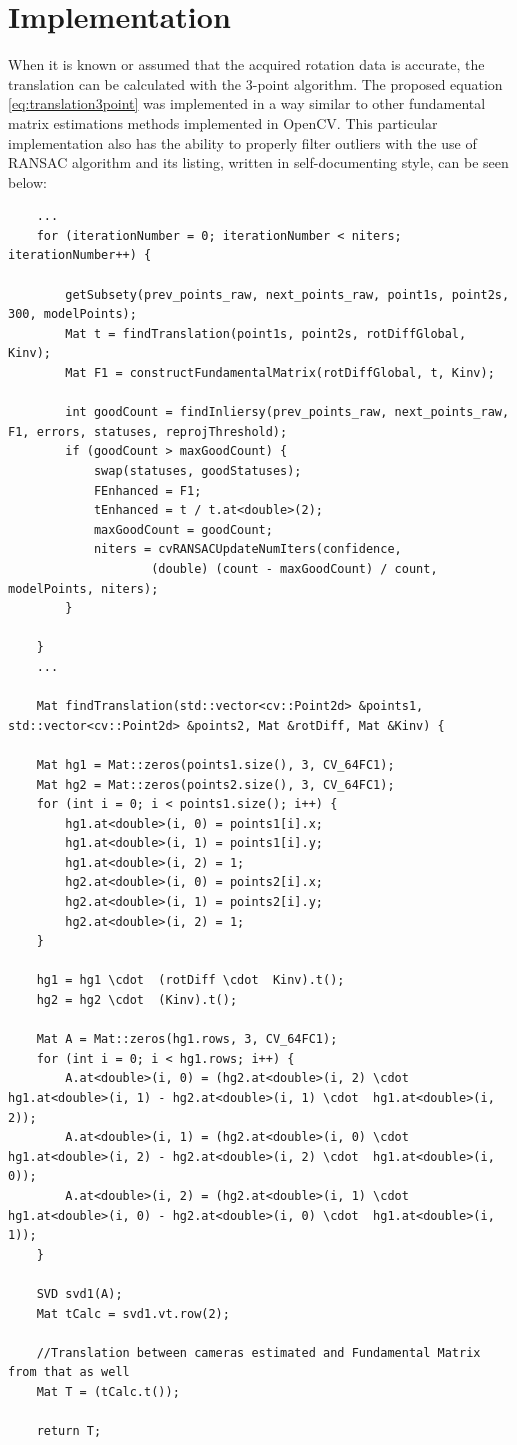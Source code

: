 \section{Implementation} %
When it is known or assumed that the acquired rotation data is accurate, the translation can be calculated with the 3-point algorithm. The proposed equation \ref{eq:translation3point} was implemented in a way similar to other fundamental matrix estimations methods implemented in OpenCV. This particular implementation also has the ability to properly filter outliers with the use of RANSAC algorithm and its listing, written in self-documenting style, can be seen below:
\begin{lstlisting}
    ...
    for (iterationNumber = 0; iterationNumber < niters; iterationNumber++) {

        getSubsety(prev_points_raw, next_points_raw, point1s, point2s, 300, modelPoints);
        Mat t = findTranslation(point1s, point2s, rotDiffGlobal, Kinv);
        Mat F1 = constructFundamentalMatrix(rotDiffGlobal, t, Kinv);

        int goodCount = findInliersy(prev_points_raw, next_points_raw, F1, errors, statuses, reprojThreshold);
        if (goodCount > maxGoodCount) {
            swap(statuses, goodStatuses);
            FEnhanced = F1;
            tEnhanced = t / t.at<double>(2);
            maxGoodCount = goodCount;
            niters = cvRANSACUpdateNumIters(confidence,
                    (double) (count - maxGoodCount) / count, modelPoints, niters);
        }

    }
    ...    
    
    Mat findTranslation(std::vector<cv::Point2d> &points1, std::vector<cv::Point2d> &points2, Mat &rotDiff, Mat &Kinv) {

    Mat hg1 = Mat::zeros(points1.size(), 3, CV_64FC1);
    Mat hg2 = Mat::zeros(points2.size(), 3, CV_64FC1);
    for (int i = 0; i < points1.size(); i++) {
        hg1.at<double>(i, 0) = points1[i].x;
        hg1.at<double>(i, 1) = points1[i].y;
        hg1.at<double>(i, 2) = 1;
        hg2.at<double>(i, 0) = points2[i].x;
        hg2.at<double>(i, 1) = points2[i].y;
        hg2.at<double>(i, 2) = 1;
    }

    hg1 = hg1 \cdot  (rotDiff \cdot  Kinv).t();
    hg2 = hg2 \cdot  (Kinv).t();

    Mat A = Mat::zeros(hg1.rows, 3, CV_64FC1);
    for (int i = 0; i < hg1.rows; i++) {
        A.at<double>(i, 0) = (hg2.at<double>(i, 2) \cdot  hg1.at<double>(i, 1) - hg2.at<double>(i, 1) \cdot  hg1.at<double>(i, 2));
        A.at<double>(i, 1) = (hg2.at<double>(i, 0) \cdot  hg1.at<double>(i, 2) - hg2.at<double>(i, 2) \cdot  hg1.at<double>(i, 0));
        A.at<double>(i, 2) = (hg2.at<double>(i, 1) \cdot  hg1.at<double>(i, 0) - hg2.at<double>(i, 0) \cdot  hg1.at<double>(i, 1));
    }

    SVD svd1(A);
    Mat tCalc = svd1.vt.row(2);

    //Translation between cameras estimated and Fundamental Matrix from that as well
    Mat T = (tCalc.t());

    return T;

\end{lstlisting}


